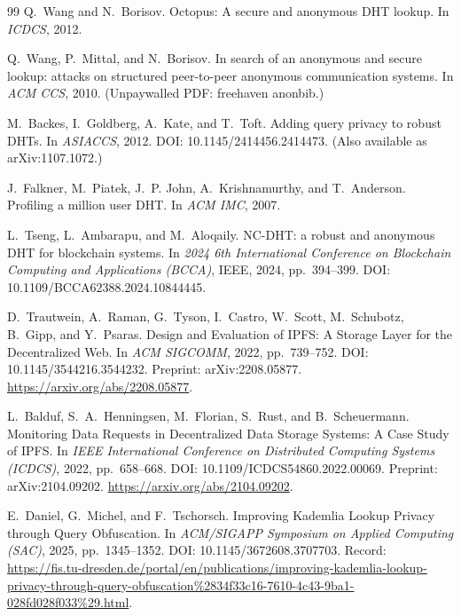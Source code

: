 \documentclass[11pt]{article}
\begin{document}
\begin{thebibliography}{99}
Q.~Wang and N.~Borisov.
\newblock Octopus: A secure and anonymous DHT lookup.
\newblock In \emph{ICDCS}, 2012.

Q.~Wang, P.~Mittal, and N.~Borisov.
\newblock In search of an anonymous and secure lookup: attacks on structured peer-to-peer anonymous communication systems.
\newblock In \emph{ACM CCS}, 2010. (Unpaywalled PDF: freehaven anonbib.)

M.~Backes, I.~Goldberg, A.~Kate, and T.~Toft.
\newblock Adding query privacy to robust DHTs.
\newblock In \emph{ASIACCS}, 2012.
\newblock DOI: 10.1145/2414456.2414473.
\newblock (Also available as arXiv:1107.1072.)

J.~Falkner, M.~Piatek, J.~P. John, A.~Krishnamurthy, and T.~Anderson.
\newblock Profiling a million user DHT.
\newblock In \emph{ACM IMC}, 2007.

L.~Tseng, L.~Ambarapu, and M.~Aloqaily.
\newblock NC-DHT: a robust and anonymous DHT for blockchain systems.
\newblock In \emph{2024 6th International Conference on Blockchain Computing and Applications (BCCA)}, IEEE, 2024, pp.~394--399.
\newblock DOI: 10.1109/BCCA62388.2024.10844445.

D.~Trautwein, A.~Raman, G.~Tyson, I.~Castro, W.~Scott, M.~Schubotz, B.~Gipp, and Y.~Psaras.
\newblock Design and Evaluation of {IPFS}: A Storage Layer for the Decentralized Web.
\newblock In \emph{ACM SIGCOMM}, 2022, pp.~739--752.
\newblock DOI: 10.1145/3544216.3544232.
\newblock Preprint: arXiv:2208.05877.
\newblock \url{https://arxiv.org/abs/2208.05877}.


L.~Balduf, S.~A.~Henningsen, M.~Florian, S.~Rust, and B.~Scheuermann.
\newblock Monitoring Data Requests in Decentralized Data Storage Systems: A Case Study of {IPFS}.
\newblock In \emph{IEEE International Conference on Distributed Computing Systems (ICDCS)}, 2022, pp.~658--668.
\newblock DOI: 10.1109/ICDCS54860.2022.00069.
\newblock Preprint: arXiv:2104.09202.
\newblock \url{https://arxiv.org/abs/2104.09202}.

E.~Daniel, G.~Michel, and F.~Tschorsch.
\newblock Improving {Kademlia} Lookup Privacy through Query Obfuscation.
\newblock In \emph{ACM/SIGAPP Symposium on Applied Computing (SAC)}, 2025, pp.~1345--1352.
\newblock DOI: 10.1145/3672608.3707703.
\newblock Record: \url{https://fis.tu-dresden.de/portal/en/publications/improving-kademlia-lookup-privacy-through-query-obfuscation%2834f33c16-7610-4c43-9ba1-028fd028f033%29.html}.



\end{thebibliography}
\end{document}
